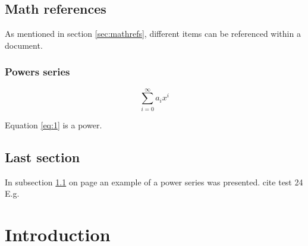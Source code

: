 \documentclass{article}
\begin{document}
\section{Math references} 
\label{mathrefs}
As mentioned in section \ref{sec:mathrefs}, different items can be referenced within a document.

\subsection{Powers series} 
		\label{sec:subsection}

		\begin{equation} 
	\label{eq:1}
\sum_{i=0}^{\infty} a_i x^i
\end{equation}

Equation \ref{eq:1} is a power.
\vspace{0.5cm}


\section{Last section}
In subsection \ref{sec:subsection} on page \pageref{eq:1} an example of a power series was presented.
cite test 24 E.g.


\chapter{Introduction} %
\end{document}
